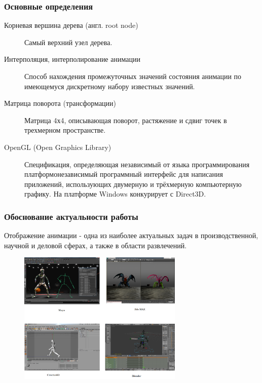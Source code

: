\documentclass{beamer}
\begin{document}
\begin{frame}
\frametitle{Основные определения}

\begin{description}

\item[Корневая вершина дерева (англ. root node)]
Самый верхний узел дерева.

\item[Интерполяция, интерполирование анимации]
Способ нахождения промежуточных значений состояния анимации по имеющемуся дискретному набору известных значений.

\item[Матрица поворота (трансформации)]
Матрица 4х4, описывающая поворот, растяжение и сдвиг точек в трехмерном пространстве.

\item[OpenGL (Open Graphics Library)]
Спецификация, определяющая независимый от языка программирования платформонезависимый программный интерфейс для написания приложений, использующих двумерную и трёхмерную компьютерную графику. На платформе Windows конкурирует с Direct3D.

\end{description}
\end{frame}


\begin{frame}
\frametitle{Обоснование актуальности работы}

\scriptsize{Отображение анимации - одна из наиболее актуальных задач  в производственной, научной и деловой сферах, а также в области развлечений.}
\begin{figure}[h!]
    \centering
    \includegraphics[width=0.7\textwidth]{all_tools.png}
\end{figure}

\end{frame}
\end{document}
